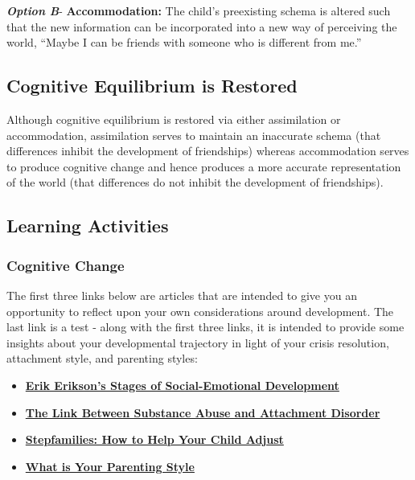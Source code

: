 \documentclass[
]{book}
\providecommand{\tightlist}{%
  \setlength{\itemsep}{0pt}\setlength{\parskip}{0pt}}
\begin{document}
\textbf{\emph{Option B}}- \textbf{Accommodation:} The child's preexisting schema is altered such that the new information can be incorporated into a new way of perceiving the world, ``Maybe I can be friends with someone who is different from me.''

\hypertarget{cognitive-equilibrium-is-restored}{%
\subsection*{Cognitive Equilibrium is Restored}\label{cognitive-equilibrium-is-restored}}

Although cognitive equilibrium is restored via either assimilation or accommodation, assimilation serves to maintain an inaccurate schema (that differences inhibit the development of friendships) whereas accommodation serves to produce cognitive change and hence produces a more accurate representation of the world (that differences do not inhibit the development of friendships).

\hypertarget{learning-activities-3}{%
\subsection*{Learning Activities}\label{learning-activities-3}}

\hypertarget{cognitive-change}{%
\subsubsection*{Cognitive Change}\label{cognitive-change}}

The first three links below are articles that are intended to give you an opportunity to reflect upon your own considerations around development. The last link is a test - along with the first three links, it is intended to provide some insights about your developmental trajectory in light of your crisis resolution, attachment style, and parenting styles:

\begin{itemize}
\tightlist
\item
  \href{http://www.childdevelopmentinfo.com/development/erickson.shtml}{\textbf{Erik Erikson's Stages of Social-Emotional Development}}\\
\item
  \href{http://www.attachmentdisorder.net/}{\textbf{The Link Between Substance Abuse and Attachment Disorder}}\\
\item
  \href{https://www.mayoclinic.org/healthy-lifestyle/childrens-health/in-depth/stepfamilies/art-20047046}{\textbf{Stepfamilies: How to Help Your Child Adjust}}\\
\item
  \href{https://www.3smartcubes.com/pages/tests/parentingstyle/parentingstyle_instructions/}{\textbf{What is Your Parenting Style}}
\end{itemize}
\end{document}
